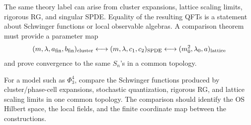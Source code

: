 The same theory label can arise from cluster expansions, lattice scaling
limits, rigorous RG, and singular SPDE.  Equality of the resulting QFTs is a
statement about Schwinger functions or local observable algebras.  A
comparison theorem must provide a parameter map
\[
  (m,\lambda,a_{\rm fin},b_{\rm fin})_{\rm cluster}
  \longleftrightarrow
  (m,\lambda,c_1,c_2)_{\rm SPDE}
  \longleftrightarrow
  (m_0^2,\lambda_0,a)_{\rm lattice}
\]
and prove convergence to the same \(S_n\)'s in a common topology.

\begin{openproblem}
\label{op:constructive-route-comparison}
For a model such as \(\Phi^4_3\), compare the Schwinger functions produced by
cluster/phase-cell expansions, stochastic quantization, rigorous RG, and
lattice scaling limits in one common topology.  The comparison should
identify the OS Hilbert space, the local fields, and the finite coordinate
map between the constructions.
\end{openproblem}
